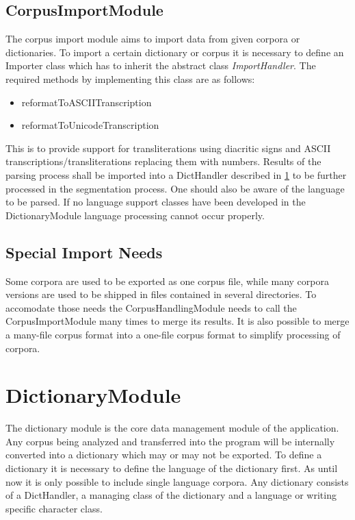 \documentclass[10pt,a4paper,titlepage]{report}
\begin{document}
	\subsection{CorpusImportModule}
	\label{sec:corpusImport}
	The corpus import module aims to import data from given corpora or dictionaries.
	To import a certain dictionary or corpus it is necessary to define an Importer class which has to inherit the abstract class \textit{ImportHandler}.
	The required methods by implementing this class are as follows:
	\begin{itemize}
		\item reformatToASCIITranscription 
		\item reformatToUnicodeTranscription
	\end{itemize}
	This is to provide support for transliterations using diacritic signs and ASCII transcriptions/transliterations replacing them with numbers.
	Results of the parsing process shall be imported into a DictHandler described in \ref{sec:dictionaryModule} to be further processed in the segmentation process. One should also be aware of the language to be parsed. If no language support classes have been developed in the DictionaryModule language processing cannot occur properly.
	\subsection{Special Import Needs}
	Some corpora are used to be exported as one corpus file, while many corpora versions are used to be shipped in files contained in several directories. 
	To accomodate those needs the CorpusHandlingModule needs to call the CorpusImportModule many times to merge its results. It is also possible to merge a many-file corpus format into a one-file corpus format to simplify processing of corpora.
	\section{DictionaryModule}
	\label{sec:dictionaryModule}
	The dictionary module is the core data management module of the application. Any corpus being analyzed and transferred into the program will be internally converted into a dictionary which may or may not be exported. To define a dictionary it is necessary to define the language of the dictionary first. As until now it is only possible to include single language corpora. 
	Any dictionary consists of a DictHandler, a managing class of the dictionary and a language or writing specific character class.
\end{document}
